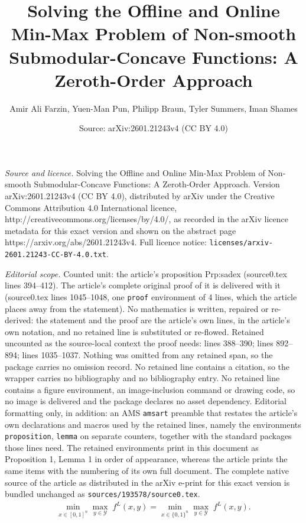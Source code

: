 \documentclass[10pt,a4paper]{amsart}
\title{Solving the Offline and Online Min-Max Problem of Non-smooth Submodular-Concave Functions: A Zeroth-Order Approach}
\author{Amir Ali Farzin, Yuen-Man Pun, Philipp Braun, Tyler Summers, Iman Shames}
\date{Source: arXiv:2601.21243v4 (CC BY 4.0)}
\begin{document}
\maketitle

\noindent\emph{Source and licence.} Solving the Offline and Online Min-Max Problem of Non-smooth Submodular-Concave Functions: A Zeroth-Order Approach. Version arXiv:2601.21243v4 (CC BY 4.0), distributed by arXiv under the Creative Commons Attribution 4.0 International licence, http://creativecommons.org/licenses/by/4.0/, as recorded in the arXiv licence metadata for this exact version and shown on the abstract page https://arxiv.org/abs/2601.21243v4. Full licence notice: \texttt{licenses/arxiv-2601.21243-CC-BY-4.0.txt}.\par\smallskip

\noindent\textit{Editorial scope.} Counted unit: the article's proposition Prp:sadex (source0.tex lines 394--412). The article's complete original proof of it is delivered with it (source0.tex lines 1045--1048, one \texttt{proof} environment of 4 lines, which the article places away from the statement). No mathematics is written, repaired or re-derived: the statement and the proof are the article's own lines, in the article's own notation, and no retained line is substituted or re-flowed.  Retained uncounted as the source-local context the proof needs: lines 388--390; lines 892--894; lines 1035--1037.  Nothing was omitted from any retained span, so the package carries no omission record.  No retained line contains a citation, so the wrapper carries no bibliography and no bibliography entry.  No retained line contains a figure environment, an image-inclusion command or drawing code, so no image is delivered and the package declares no asset dependency.  Editorial formatting only, in addition: an AMS \texttt{amsart} preamble that restates the article's own declarations and macros used by the retained lines, namely the environments \texttt{proposition}, \texttt{lemma} on separate counters, together with the standard packages those lines need.  The retained environments print in this document as Proposition 1, Lemma 1 in order of appearance, whereas the article prints the same items with the numbering of its own full document.  The complete native source of the article as distributed in the arXiv e-print for this exact version is bundled unchanged as \texttt{sources/193578/source0.tex}.
\begin{align}\label{eq:ver1}
    \underset{x \in [0,1]^n}{\min}\underset{y \in \mathcal{Y}}{\max}\;f^L(x,y)=\underset{x \in \{0,1\}^n}{\min}\underset{y \in \mathcal{Y}}{\max}\;f^L(x,y).
\end{align}
\end{document}
